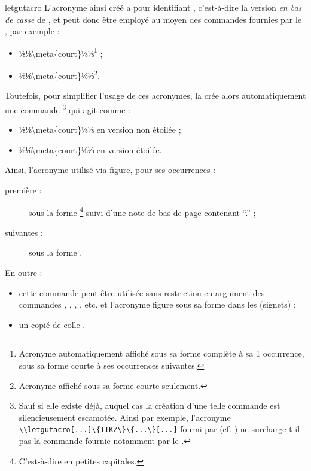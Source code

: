 \documentclass{letgut}
\begin{document}
\begin{docCommand}{letgutacro}{}
  L'acronyme ainsi créé a pour identifiant , c'est-à-dire
  la version \emph{en bas de casse} de , et peut donc
  être employé au moyen des commandes fournies par le , par
  exemple :
  \begin{itemize}
  \item ⅛\ac{⅛\meta{court}⅛}⅛\footnote{Acronyme automatiquement affiché sous sa
      forme complète à sa 1\iere{} occurrence, sous sa forme courte à ses
      occurrences suivantes.} ;
  \item ⅛\acs{⅛\meta{court}⅛}⅛\footnote{Acronyme affiché sous sa forme courte
      seulement.}.
  \end{itemize}
  Toutefois, pour simplifier l'usage de ces acronymes, la  crée
  alors automatiquement une commande %
  \footnote{%
    Sauf si elle existe déjà, auquel cas la création d'une telle commande est
    silencieusement escamotée. Ainsi par exemple, l'acronyme
    \lstinline+\\letgutacro[...]\{TIKZ\}\{...\}[...]+
    fourni par  (cf. ) ne surcharge-t-il
    pas la commande  fournie notamment par le
    .%
  }
  qui agit comme :
  \begin{itemize}
  \item ⅛\ac{⅛\meta{court}⅛}⅛ en version non étoilée ;
  \item ⅛\acs{⅛\meta{court}⅛}⅛ en version étoilée.
  \end{itemize}
\end{docCommand}
Ainsi, l'acronyme utilisé via  figure, pour ses
occurrences :
\begin{description}
\item[première :] sous la forme \footnote{C'est-à-dire
     en petites capitales.} suivi d'une note de bas de
  page contenant \enquote{.} ;
\item[suivantes :] sous la forme .
\end{description}

En outre :
\begin{itemize}
\item cette commande peut être utilisée sans restriction en argument des
  commandes , , ,
  , etc. et l'acronyme figure sous sa forme  dans
  les  (signets) ;
\item un copié de  colle .
\end{itemize}
\end{document}
